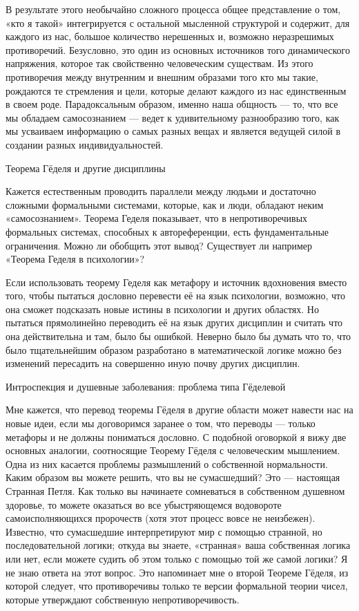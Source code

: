\documentclass[../main.tex]{subfiles}
\begin{document}
В результате этого необычайно сложного процесса общее представление о том, «кто я такой» интегрируется с остальной мысленной структурой и содержит, для каждого из нас, большое количество нерешенных и, возможно неразрешимых противоречий. Безусловно, это один из основных источников того динамического напряжения, которое так свойственно человеческим существам. Из этого противоречия между внутренним и внешним образами того кто мы такие, рождаются те стремления и цели, которые делают каждого из нас единственным в своем роде. Парадоксальным образом, именно наша общность --- то, что все мы обладаем самосознанием --- ведет к удивительному разнообразию того, как мы усваиваем информацию о самых разных вещах и является ведущей силой в создании разных индивидуальностей.

Теорема Гёделя и другие дисциплины

Кажется естественным проводить параллели между людьми и достаточно сложными формальными системами, которые, как и люди, обладают неким «самосознанием». Теорема Геделя показывает, что в непротиворечивых формальных системах, способных к автореференции, есть фундаментальные ограничения. Можно ли обобщить этот вывод? Существует ли например «Теорема Геделя в психологии»?

Если использовать теорему Геделя как метафору и источник вдохновения вместо того, чтобы пытаться дословно перевести её на язык психологии, возможно, что она сможет подсказать новые истины в психологии и других областях. Но пытаться прямолинейно переводить её на язык других дисциплин и считать что она действительна и там, было бы ошибкой. Неверно было бы думать что то, что было тщательнейшим образом разработано в математической логике можно без изменений пересадить на совершенно иную почву других дисциплин.

Интроспекция и душевные заболевания: проблема типа Гёделевой

Мне кажется, что перевод теоремы Гёделя в другие области может навести нас на новые идеи, если мы договоримся заранее о том, что переводы --- только метафоры и не должны пониматься дословно. С подобной оговоркой я вижу две основных аналогии, соотносящие Теорему Гёделя с человеческим мышлением. Одна из них касается проблемы размышлений о собственной нормальности. Каким образом вы можете решить, что вы не сумасшедший? Это --- настоящая Странная Петля. Как только вы начинаете сомневаться в собственном душевном здоровье, то можете оказаться во все убыстряющемся водовороте самоисполняющихся пророчеств (хотя этот процесс вовсе не неизбежен). Известно, что сумасшедшие интерпретируют мир с помощью странной, но последовательной логики; откуда вы знаете, «странная» ваша собственная логика или нет, если можете судить об этом только с помощью той же самой логики? Я не знаю ответа на этот вопрос. Это напоминает мне о второй Теореме Гёделя, из которой следует, что противоречивы только те версии формальной теории чисел, которые утверждают собственную непротиворечивость.
\end{document}
